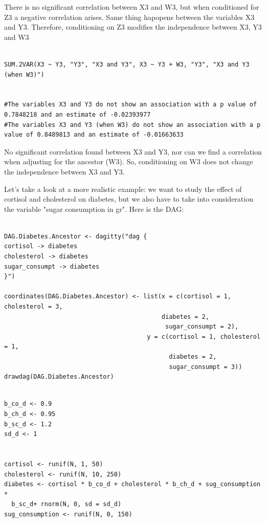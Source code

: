 \documentclass{article}
\begin{document}
There is no significant correlation between X3 and W3, but when conditioned for Z3 a negative correlation arises. Same thing hapopens between the  variables X3 and Y3. Therefore, conditioning on Z3 modifies the independence between X3, Y3 and W3



\begin{lstlisting}

SUM.2VAR(X3 ~ Y3, "Y3", "X3 and Y3", X3 ~ Y3 + W3, "Y3", "X3 and Y3 (when W3)")


#The variables X3 and Y3 do not show an association with a p value of 0.7848218 and an estimate of -0.02393977 
#The variables X3 and Y3 (when W3) do not show an association with a p value of 0.8489813 and an estimate of -0.01663633 

\end{lstlisting}

No significant correlation found between X3 and Y3, nor can we find a  correlation when adjusting for the ancestor (W3). So, conditioning on W3 does not change the independence between X3 and Y3.

Let's take a look at a more realistic example: we want to study the effect of cortisol and cholesterol on diabetes, but we also have to take into consideration the variable "sugar consumption in gr". Here is the DAG:


\begin{lstlisting}

DAG.Diabetes.Ancestor <- dagitty("dag {
cortisol -> diabetes
cholesterol -> diabetes
sugar_consumpt -> diabetes
}")

coordinates(DAG.Diabetes.Ancestor) <- list(x = c(cortisol = 1, cholesterol = 3,
                                           diabetes = 2, 
                                            sugar_consumpt = 2),
                                       y = c(cortisol = 1, cholesterol = 1, 
                                             diabetes = 2, 
                                             sugar_consumpt = 3))
drawdag(DAG.Diabetes.Ancestor)

\end{lstlisting}





\begin{lstlisting}

b_co_d <- 0.9
b_ch_d <- 0.95
b_sc_d <- 1.2
sd_d <- 1


cortisol <- runif(N, 1, 50)
cholesterol <- runif(N, 10, 250)
diabetes <- cortisol * b_co_d + cholesterol * b_ch_d + sug_consumption * 
  b_sc_d+ rnorm(N, 0, sd = sd_d)
sug_consumption <- runif(N, 0, 150)

\end{lstlisting}
\end{document}
